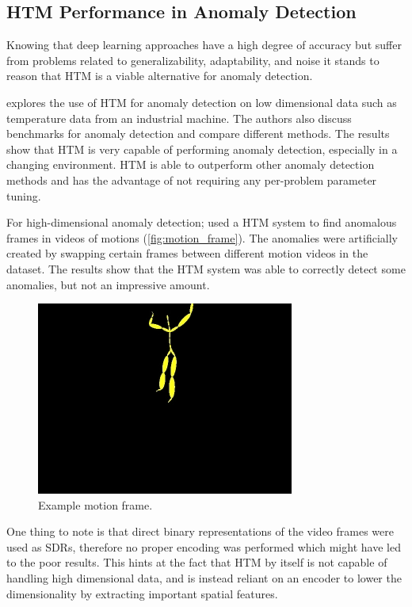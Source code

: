 \subsection{HTM Performance in Anomaly Detection}
\label{sec:htm_perf}
Knowing that deep learning approaches have a high degree of accuracy but suffer from problems related to generalizability, adaptability, and noise it stands to reason that HTM is a viable alternative for anomaly detection.\par
\textcite{AHMAD2017134} explores the use of HTM for anomaly detection on low dimensional data such as temperature data from an industrial machine. The authors also discuss benchmarks for anomaly detection and compare different methods. The results show that HTM is very capable of performing anomaly detection, especially in a changing environment. HTM is able to outperform other anomaly detection methods and has the advantage of not requiring any per-problem parameter tuning.
\par
For high-dimensional anomaly detection; \textcite{MotionAnomalyDetection} used a HTM system to find anomalous frames in videos of motions (\autoref{fig:motion_frame}). The anomalies were artificially created by swapping certain frames between different motion videos in the dataset. The results show that the HTM system was able to correctly detect some anomalies, but not an impressive amount.
\begin{figure}[H]
    \centering
    \includegraphics[width=0.5\linewidth]{resources/related_works/motion_frame.png}
    \caption{Example motion frame\cite{MotionAnomalyDetection}.}
    \label{fig:motion_frame}
\end{figure}
One thing to note is that direct binary representations of the video frames were used as SDRs, therefore no proper encoding was performed which might have led to the poor results. This hints at the fact that HTM by itself is not capable of handling high dimensional data, and is instead reliant on an encoder to lower the dimensionality by extracting important spatial features.


